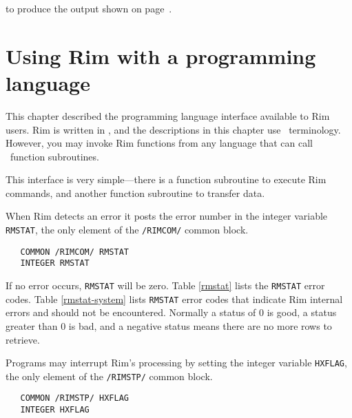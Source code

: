 \documentclass[11pt,a4paper]{report}
\begin{document}
to produce the output shown on page~\pageref{while-rpt}.
 
 
 
 
%
%
 
\chapter{Using Rim with a programming language}
%
\label{pi-chapter}
This chapter described the programming language interface
available to Rim users.
Rim is written in \FortranF, and the descriptions in this
chapter use \FortranF\ terminology.  However, you may
invoke Rim functions from any language that can
call \FortranF\ function subroutines.
 
This interface is very simple---there is a function subroutine
to execute Rim commands, and another function subroutine
to transfer data.
 
 
When Rim detects an error it posts the error number in
the integer variable \verb!RMSTAT!, the only element
of the \verb!/RIMCOM/! common block.
 
\begin{verbatim}
   COMMON /RIMCOM/ RMSTAT
   INTEGER RMSTAT
\end{verbatim}
 
If no error occurs, \verb!RMSTAT! will be zero.
Table \ref{rmstat} lists the \verb!RMSTAT! error codes.
Table \ref{rmstat-system} lists \verb!RMSTAT! error codes that
indicate Rim internal errors and should not be encountered.
Normally a status of 0 is good, a status greater than 0 is bad, and
a negative status means there are no more rows to retrieve.
 
 
Programs may interrupt Rim's processing by setting
the integer variable \verb!HXFLAG!, the only element
of the \verb!/RIMSTP/! common block.
 
\begin{verbatim}
   COMMON /RIMSTP/ HXFLAG
   INTEGER HXFLAG
\end{verbatim}
 
\end{document}
